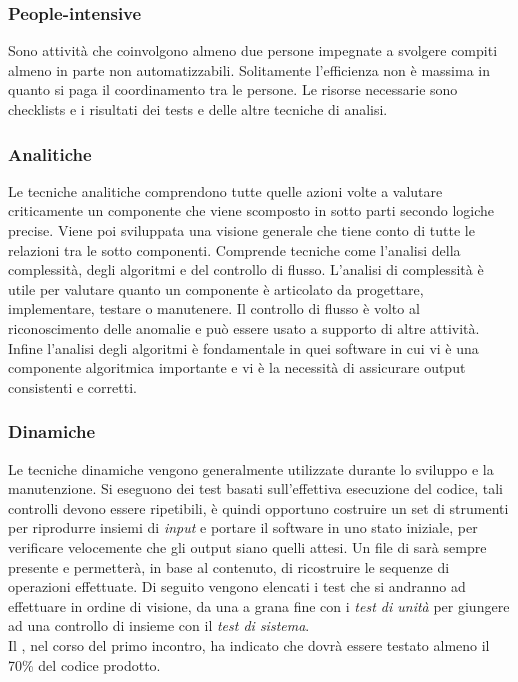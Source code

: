 		\subsubsection{People-intensive}	
	Sono attività che coinvolgono almeno due persone impegnate a svolgere compiti almeno in parte non automatizzabili. Solitamente l'efficienza non è massima in quanto si paga il coordinamento tra le persone. Le risorse necessarie sono checklists e i risultati dei tests e delle altre tecniche di analisi.	
	
		\subsubsection{Analitiche}		
		Le tecniche analitiche comprendono tutte quelle azioni volte a valutare criticamente un 	componente che viene scomposto in sotto parti secondo logiche precise. Viene poi sviluppata una visione generale che tiene conto di tutte le relazioni tra le sotto componenti. Comprende tecniche come l'analisi della complessità, degli algoritmi e del controllo di flusso. L'analisi di complessità è utile per valutare quanto un componente è articolato da progettare, implementare, testare o manutenere. Il controllo di flusso è volto al riconoscimento delle anomalie e può essere usato a supporto di altre attività. Infine l'analisi degli algoritmi è fondamentale in quei software in cui vi è una componente algoritmica importante e vi è la necessità di assicurare output consistenti e corretti. 
				
		\subsubsection{Dinamiche}
		Le tecniche dinamiche vengono generalmente utilizzate durante lo sviluppo e la manutenzione. Si eseguono dei test basati sull'effettiva esecuzione del codice, tali controlli devono essere ripetibili, è quindi opportuno costruire un set di strumenti per riprodurre insiemi di \emph{input} e portare il software in uno stato iniziale, per verificare velocemente che gli output siano quelli attesi. Un file di  sarà sempre presente e permetterà, in base al contenuto, di ricostruire le sequenze di operazioni effettuate. Di seguito vengono elencati i test che si andranno ad effettuare in ordine di visione, da una a grana fine con i \emph{test di unità} per giungere ad una controllo di insieme con il \emph{test di sistema}.\\
		Il , nel corso del primo incontro, ha indicato che dovrà essere testato almeno il  70\% del codice prodotto.
		
